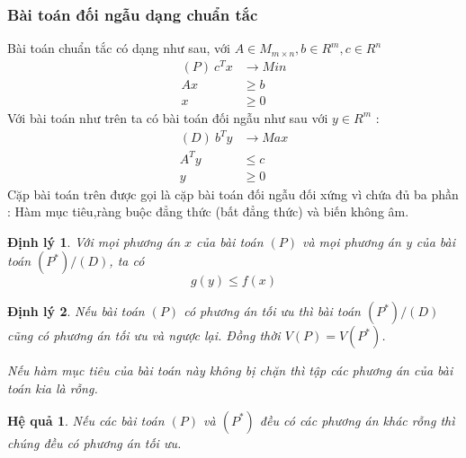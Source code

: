 \documentclass{article}
\newtheorem{dl}{Định lý}
\newtheorem{hq}{Hệ quả}
\begin{document}
        \subsubsection{Bài toán đối ngẫu dạng chuẩn tắc}
            Bài toán chuẩn tắc có dạng như sau, với $A \in M_{m \times n},b \in R^m, c \in R^n$ \\ 
                \begin{equation}
                    \begin{split}
                        (P) \: c^Tx &\rightarrow Min \\
                        Ax &\geq b \\
                        x &\geq 0 
                    \end{split}
                \end{equation}
            Với bài toán như trên ta có bài toán đối ngẫu như sau với $y \in R^m$ : \\
                \begin{equation}
                    \begin{split}
                        (D) \: b^Ty &\rightarrow Max \\
                        A^Ty &\leq c \\
                        y &\geq 0
                    \end{split}
                \end{equation}
            Cặp bài toán trên được gọi là cặp bài toán đối ngẫu đối xứng vì chứa đủ ba phần : Hàm mục tiêu,ràng buộc đẳng thức (bất đẳng thức) và biến không âm. \\
                \begin{dl}
                    Với mọi phương án $x$ của bài toán $(P)$ và mọi phương án y của bài toán $(P^*)/(D)$, ta có $$g(y) \leq f(x)$$
                \end{dl}
                \begin{dl}
                    \item Nếu bài toán $(P)$ có phương án tối ưu thì bài toán $(P^*)/(D)$ cũng có phương án tối ưu và ngược lại. Đồng thời $V(P)=V(P^*)$.
                    \item Nếu hàm mục tiêu của bài toán này không bị chặn thì tập các phương án của bài toán kia là rỗng.
                \end{dl}
                \begin{hq}
                    Nếu các bài toán $(P)$ và $(P^*)$ đều có các phương án khác rỗng thì chúng đều có phương án tối ưu.
                \end{hq}
\end{document}
